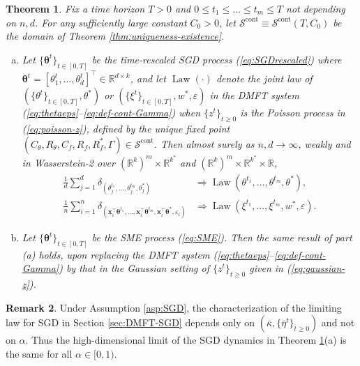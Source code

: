 \documentclass[11pt,letterpaper,reqno]{amsart}
\newtheorem{thm}{Theorem}[section]
\theoremstyle{definition}
\newtheorem{remark}[thm]{Remark}
\def\eps{\varepsilon}
\def\R{\mathbb{R}}
\def\Law{\operatorname{Law}}
\def\cS{\mathcal{S}}
\def\x{\mathbf{x}}
\def\btheta{\boldsymbol{\theta}}
\begin{document}
\begin{thm}\label{thm:DMFT-limit}
Fix a time horizon $T>0$ and $0 \leq t_1 \leq \ldots \leq t_m \leq T$
not depending on $n,d$. For any sufficiently large constant $C_0>0$, let
$\cS^\text{cont} \equiv \cS^\text{cont}(T,C_0)$ be the domain of Theorem
\ref{thm:uniqueness-existence}.
\begin{enumerate}[(a)]
\item Let $\{\btheta^t\}_{t \in [0,T]}$
be the time-rescaled SGD process (\ref{eq:SGDrescaled})
where $\btheta^t=[\theta_1^t,\ldots,\theta_d^t]^\top \in \R^{d \times k}$,
and let $\Law(\cdot)$ denote the joint law of
$(\{\theta^t\}_{t \in [0,T]},\theta^*)$ or
$(\{\xi^t\}_{t \in [0,T]},w^*,\eps)$ in the DMFT
system (\ref{eq:thetaeps}--\ref{eq:def-cont-Gamma}) when $\{z^t\}_{t \geq 0}$ is the Poisson process
in (\ref{eq:poisson-z}),
defined by the unique fixed point $(C_\theta,R_\theta,C_f,R_f,R_f^*,\Gamma) \in
\cS^\text{cont}$. Then almost surely as $n,d \to \infty$,
weakly and in Wasserstein-2 over $(\R^k)^m \times \R^{k^*}$ and $(\R^k)^m \times \R^{k^*} \times \R$,
\begin{align}
\frac{1}{d}\sum_{j=1}^d
\delta_{(\theta_j^{t_1},\ldots,\theta_j^{t_m},\theta_j^*)}
&\Rightarrow
\Law(\theta^{t_1},\ldots,\theta^{t_m},\theta^*),\label{eq:DMFT-limit-theta}\\
\frac{1}{n}\sum_{i=1}^n \delta_{(\x_i^\top \btheta^{t_1},
\ldots,\x_i^\top \btheta^{t_m},\x_i^\top \btheta^*,\eps_i)}
&\Rightarrow \Law(\xi^{t_1},\ldots,\xi^{t_m},w^*,\eps).\label{eq:DMFT-limit-xi}
\end{align}
\item Let $\{\btheta^t\}_{t \in [0,T]}$ be the SME process
(\ref{eq:SME}). Then the same result of part (a) holds, upon replacing
the DMFT system (\ref{eq:thetaeps}--\ref{eq:def-cont-Gamma}) by that
in the Gaussian setting of $\{z^t\}_{t \geq 0}$ given in (\ref{eq:gaussian-z}).
\end{enumerate}
\end{thm}

\begin{remark}
Under Assumption \ref{asp:SGD}, the characterization of the limiting law for SGD
in Section \ref{sec:DMFT-SGD} depends only on
$(\bar\kappa,\{\bar\eta^t\}_{t \geq 0})$ and not on $\alpha$. Thus the
high-dimensional limit of the SGD dynamics in Theorem \ref{thm:DMFT-limit}(a)
is the same for all $\alpha \in [0,1)$.
\end{remark}
\end{document}
